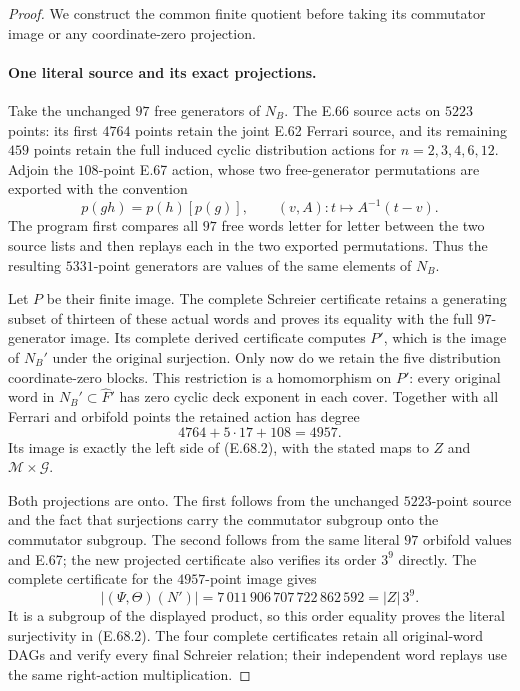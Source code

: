 \begin{proof}
We construct the common finite quotient before taking
its commutator image or any coordinate-zero projection.

\paragraph{One literal source and its exact projections.}
Take the unchanged $97$ free generators of $N_B$.
The E.66 source acts on $5223$ points: its first $4764$
points retain the joint E.62 Ferrari source, and its
remaining $459$ points retain the full induced cyclic
distribution actions for $n=2,3,4,6,12$.
Adjoin the $108$-point E.67 action, whose two free-generator
permutations are exported with the convention
\[
 p(gh)=p(h)[p(g)],\qquad
            (v,A):t\longmapsto A^{-1}(t-v).
 \tag{E.68.4}
\]
The program first compares all $97$ free words
letter for letter between the two source lists and
then replays each in the two exported permutations.
Thus the resulting $5331$-point generators are values
of the same elements of $N_B$.

Let $P$ be their finite image. The complete Schreier
certificate retains a generating subset of thirteen
of these actual words and proves its equality with
the full $97$-generator image. Its complete derived
certificate computes $P'$, which is the image of
$N_B'$ under the original surjection. Only now do
we retain the five distribution coordinate-zero
blocks. This restriction is a homomorphism on $P'$:
every original word in $N_B'\subset\widehat F'$
has zero cyclic deck exponent in each cover.
Together with all Ferrari and orbifold points the
retained action has degree
\[
                    4764+5\cdot17+108=4957.
 \tag{E.68.5}
\]
Its image is exactly the left side of
\textup{(E.68.2)}, with the stated maps to $Z$ and
$\mathcal M\times\mathcal G$.

Both projections are onto. The first follows from
the unchanged $5223$-point source and the fact that
surjections carry the commutator subgroup onto the
commutator subgroup. The second follows from the
same literal $97$ orbifold values and E.67; the new
projected certificate also verifies its order $3^9$
directly. The complete certificate for the $4957$-point
image gives
\[
  |(\Psi,\Theta)(N')|
    =7\,011\,906\,707\,722\,862\,592
    =|Z|\,3^9.
 \tag{E.68.6}
\]
It is a subgroup of the displayed product, so this
order equality proves the literal surjectivity in
\textup{(E.68.2)}. The four complete certificates
retain all original-word DAGs and verify every final
Schreier relation; their independent word replays
use the same right-action multiplication.


\end{proof}

